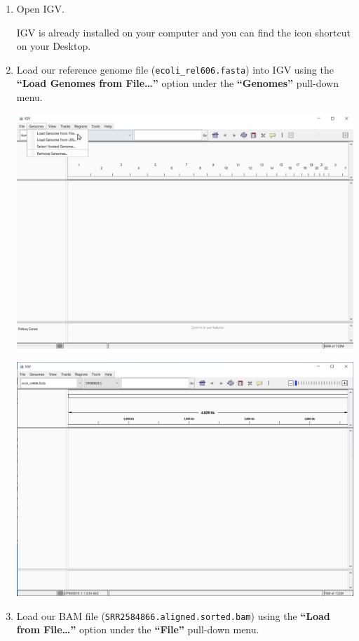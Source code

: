 \documentclass[
  letterpaper,
  DIV=11,
  numbers=noendperiod]{scrreprt}
\begin{document}
\begin{enumerate}
\def\labelenumi{\arabic{enumi}.}
\item
  Open IGV.

  \begin{tcolorbox}[enhanced jigsaw, toptitle=1mm, breakable, bottomrule=.15mm, colback=white, toprule=.15mm, opacityback=0, bottomtitle=1mm, coltitle=black, opacitybacktitle=0.6, rightrule=.15mm, colframe=quarto-callout-tip-color-frame, titlerule=0mm, colbacktitle=quarto-callout-tip-color!10!white, title=\textcolor{quarto-callout-tip-color}{\faLightbulb}\hspace{0.5em}{Tip}, left=2mm, leftrule=.75mm, arc=.35mm]

  IGV is already installed on your computer and you can find the icon
  shortcut on your Desktop.

  \end{tcolorbox}
\item
  Load our reference genome file (\texttt{ecoli\_rel606.fasta}) into IGV
  using the \textbf{``Load Genomes from File\ldots{}''} option under the
  \textbf{``Genomes''} pull-down menu.

  \includegraphics{images/igv-load-genomes-from-file.png}

  \includegraphics{images/igv-genome-loaded.png}
\item
  Load our BAM file (\texttt{SRR2584866.aligned.sorted.bam}) using the
  \textbf{``Load from File\ldots{}''} option under the \textbf{``File''}
  pull-down menu.


\end{enumerate}
\end{document}
